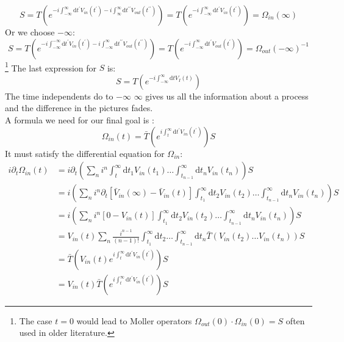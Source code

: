 \documentclass[12pt, titlepage]{article}
\begin{document}
\begin{equation}
S=T\left( e^{-i\int_{-\infty}^{\infty}\mathrm{d}t^{\prime} V_{in}(t^{\prime})
	 -i\int_{\infty}^{\infty}\mathrm{d}t^{\prime \prime} V_{out}(t^{\prime \prime})} \right)
=T\left( e^{-i\int_{-\infty}^{\infty}\mathrm{d}t^{\prime} V_{in}(t^{\prime})}\right)
=\Omega_{in}(\infty)
\end{equation}
Or we choose $ -\infty $:
\begin{equation}
S=T\left( e^{-i\int_{-\infty}^{-\infty}\mathrm{d}t^{\prime} V_{in}(t^{\prime})
	 -i\int_{-\infty}^{\infty}\mathrm{d}t^{\prime \prime} V_{out}(t^{\prime \prime})} \right)
=T\left( e^{-i\int_{-\infty}^{\infty}\mathrm{d}t^{\prime} V_{out}(t^{\prime})}\right)
=\Omega_{out}(-\infty)^{-1}
\end{equation}
\footnote{The case $ t=0 $ would lead to Moller operators $\Omega_{out}(0)\cdot
\Omega_{in}(0)=S $ often used in older literature. }
The last expression for $ S $ is:
\begin{equation}
S=T\left( e^{-i\int_{-\infty}^{\infty}\mathrm{d}t V_{I}(t)}\right)
\end{equation}
The time independents do to $ -\infty $  $ \infty $ gives us all the information about a process and the difference in the pictures fades.
\\
A formula we need for our final goal is :
\begin{equation}
\Omega_{in}(t)=
\bar{T}
\left( 
 e^{i\int_{t}^{\infty}\mathrm{d}t^{\prime} V_{in}(t^{\prime})}
\right) 
S
\end{equation}
It must satisfy the differential equation for $ \Omega_{in} $:
\begin{subequations}
\begin{flalign}
i\partial_{t}\Omega_{in}(t)
	&=i\partial_{t} \left( 
	\sum_{n} i^{n}
  	   \int_{t}^{\infty}\mathrm{d}t_1 V_{in}(t_1)
		\ldots    
	    \int_{t_{n-1}}^{\infty}\mathrm{d}t_n V_{in}(t_n)
		\right)
		S
	&\\
	&=i \left( 
	\sum_{n} i^{n}
		\partial_{t}
		\left[
		\bar{V}_{in}(\infty)-\bar{V}_{in}(t)
		 \right] 
  	    \int_{t_1}^{\infty}\mathrm{d}t_2 V_{in}(t_2)
		\ldots    
	    \int_{t_{n-1}}^{\infty}\mathrm{d}t_n V_{in}(t_n)
		\right)
		S	
	&\\
	&= i\left( 
	\sum_{n} i^{n}
		\left[
		0-V_{in}(t)
		 \right] 
  	     \int_{t_1}^{\infty}\mathrm{d}t_2 V_{in}(t_2)
		\ldots    
	    \int_{t_{n-1}}^{\infty}\mathrm{d}t_n V_{in}(t_n)
		\right)
		S		
	&\\
	&=V_{in}(t)
	\sum_{n}
	\frac{i^{n-1}}{(n-1)!} 
 	     \int_{t_1}^{\infty}\mathrm{d}t_2 
		\ldots    
	   \int_{t_{n-1}}^{\infty}\mathrm{d}t_n
		\bar{T}
		\left( 
		V_{in}(t_2)
		\ldots
		     V_{in}(t_n)
		\right)S
	&\\
	&=
	\bar{T}
	\left( 
	V_{in}(t)	
	 e^{i\int_{t}^{\infty}\mathrm{d}t^{\prime} V_{in}(t^{\prime})}
	\right)S
		&\\
	&=V_{in}(t)	
	\bar{T}
	\left( 
	 e^{i\int_{t}^{\infty}\mathrm{d}t^{\prime} V_{in}(t^{\prime})}
	\right)S
\end{flalign}
\end{subequations}
\end{document}
